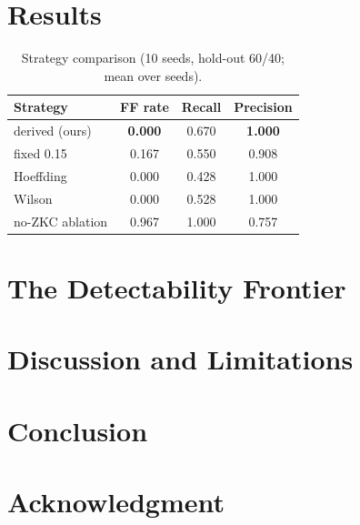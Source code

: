 \documentclass[conference]{IEEEtran}
\begin{document}
\section{Results}
\label{sec:results}
\begin{table}[t]
\centering
\caption{Strategy comparison (10 seeds, hold-out 60/40; mean over seeds).}
\label{tab:strategies}
\begin{tabular}{lccc}
\toprule
Strategy & FF rate & Recall & Precision \\
\midrule
derived (ours) & \textbf{0.000} & 0.670 & \textbf{1.000} \\
fixed 0.15     & 0.167 & 0.550 & 0.908 \\
Hoeffding      & 0.000 & 0.428 & 1.000 \\
Wilson         & 0.000 & 0.528 & 1.000 \\
no-ZKC ablation & 0.967 & 1.000 & 0.757 \\
\bottomrule
\end{tabular}
\end{table}

\section{The Detectability Frontier}
\label{sec:frontier}

\section{Discussion and Limitations}
\label{sec:discussion}

\section{Conclusion}
\label{sec:conclusion}

\section*{Acknowledgment}


% 
\end{document}
